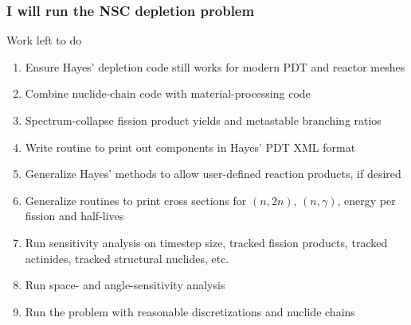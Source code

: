 \documentclass[compress,10pt]{beamer}
\begin{document}
\typeout{***********************************************************************************}

\begin{frame}
    \frametitle{I will run the NSC depletion problem}

    \begin{block}{Work left to do}
        \begin{enumerate}
            \item Ensure Hayes' depletion code still works for modern PDT and reactor meshes
            \item Combine nuclide-chain code with material-processing code
            \item Spectrum-collapse fission product yields and metastable branching ratios
            \item Write routine to print out components in Hayes' PDT XML format
            \item Generalize Hayes' methods to allow user-defined reaction products, if desired
            \item Generalize routines to print cross sections for $(n,2n)$, $(n,\gamma)$, energy per fission and half-lives
            \item Run sensitivity analysis on timestep size, tracked fission products, tracked actinides, tracked structural nuclides, etc.
            \item Run space- and angle-sensitivity analysis
            \item Run the problem with reasonable discretizations and nuclide chains
        \end{enumerate}
    \end{block}


\end{frame}

\typeout{***********************************************************************************}
\end{document}
